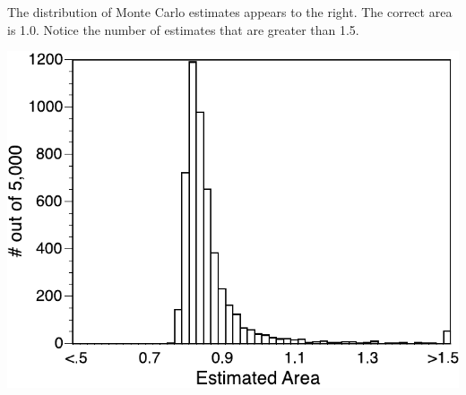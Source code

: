 \begin{minipage}{.4\textwidth}
The distribution of Monte Carlo estimates appears to the right.  The correct area is 1.0.  Notice the number of estimates that are greater than 1.5.
\end{minipage}
\hfill
\begin{minipage}{.5\textwidth}
\begin{center}
\includegraphics[width=\textwidth]{illus/t1bynorm.pdf}
\end{center} 
\end{minipage}



